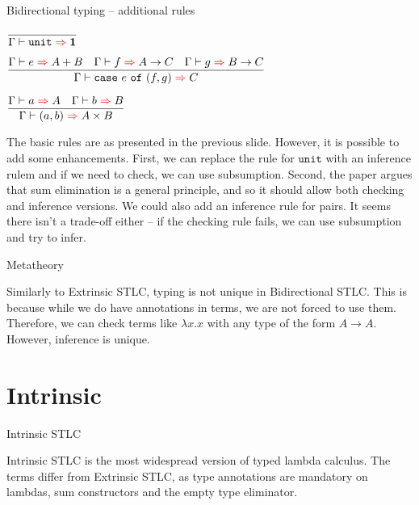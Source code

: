 \documentclass{beamer}
\newcommand{\Fun}[2]{#1 \to #2}
\newcommand{\Prod}[2]{#1 \times #2}
\newcommand{\Sum}[2]{#1 + #2}
\newcommand{\Unit}{\textbf{1}}
\newcommand{\fun}[2]{\lambda #1. #2}
\newcommand{\pair}[2]{(#1, #2)}
\newcommand{\case}[3]{\texttt{case}\ #1\ \texttt{of}\ (#2, #3)}
\newcommand{\unit}{\texttt{unit}}
\newcommand{\infrule}[3][]{\displaystyle \frac{#2}{#3} \textsc{\footnotesize{#1}}}
\begin{document}
\begin{frame}{Bidirectional typing -- additional rules}

\begin{center}
  $\infrule{}{\infer{\unit}{\Unit}}$

  \vspace{1em}

  $\infrule{\infer{e}{\Sum{A}{B}} \quad \infer{f}{\Fun{A}{C}} \quad \infer{g}{\Fun{B}{C}}}{\infer{\case{e}{f}{g}}{C}}$

  \vspace{1em}

  $\infrule{\infer{a}{A} \quad \infer{b}{B}}{\infer{\pair{a}{b}}{\Prod{A}{B}}}$
\end{center}

\vspace{1em}

The basic rules are as presented in the previous slide. However, it is possible to add some enhancements. First, we can replace the rule for $\unit$ with an inference rulem and if we need to check, we can use subsumption. Second, the paper argues that sum elimination is a general principle, and so it should allow both checking and inference versions. We could also add an inference rule for pairs. It seems there isn't a trade-off either -- if the checking rule fails, we can use subsumption and try to infer.

\end{frame}

\begin{frame}{Metatheory}

Similarly to Extrinsic STLC, typing is not unique in Bidirectional STLC. This is because while we do have annotations in terms, we are not forced to use them. Therefore, we can check terms like $\fun{x}{x}$ with any type of the form $\Fun{A}{A}$. However, inference is unique.

\end{frame}

\section{Intrinsic}

\newcommand{\ifun}[3]{\lambda #1 : #2. #3}
\newcommand{\iinl}[2]{\texttt{inl}_{#1}\ #2}
\newcommand{\iinr}[2]{\texttt{inr}_{#1}\ #2}
\newcommand{\iexfalso}[2]{\texttt{exfalso}_{#1}\ #2}

\newcommand{\termdiff}[1]{\mathcolor{red}{#1}}

\begin{frame}{Intrinsic STLC}

Intrinsic STLC is the most widespread version of typed lambda calculus. The terms differ from Extrinsic STLC, as type annotations are mandatory on lambdas, sum constructors and the empty type eliminator.

\end{frame}
\end{document}
